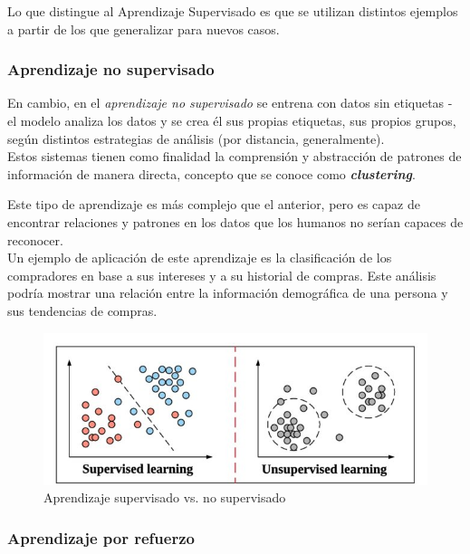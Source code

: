 Lo que distingue al Aprendizaje Supervisado es que se utilizan distintos ejemplos a partir de los que generalizar para nuevos casos. \\

\subsubsection{Aprendizaje no supervisado}

En cambio, en el \textit{aprendizaje no supervisado} se entrena con datos sin etiquetas - el modelo analiza los datos y se crea él sus propias etiquetas, sus propios grupos, según distintos estrategias de análisis (por distancia, generalmente). \\

Estos sistemas tienen como finalidad la comprensión y abstracción de patrones de información de manera directa, concepto que se conoce como \textbf{\textit{clustering}}.

Este tipo de aprendizaje es más complejo que el anterior, pero es capaz de encontrar relaciones y patrones en los datos que los humanos no serían capaces de reconocer. \\

Un ejemplo de aplicación de este aprendizaje es la clasificación de los compradores en base a sus intereses y a su historial de compras. Este análisis podría mostrar una relación entre la información demográfica de una persona y sus tendencias de compras. \\

\begin{figure}[h]
    \centering
    \includegraphics[scale=1]{cap2_contextualizacion/images/diff_sup_unsu.jpg}
    \caption{Aprendizaje supervisado vs. no supervisado}
    \label{fig:diff_sup_unsu}
\end{figure}

\subsubsection{Aprendizaje por refuerzo}

